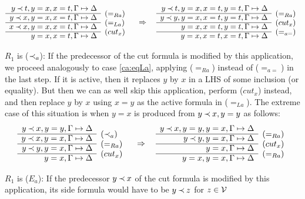\begin{PROOF}
\begin{LS}
\begin{LSA}
\[\begin{array}{rl}
y\Incl t, y=x, x=t,\GSD  \\ \cline{1-1}
y\Incl x, y=x, x=t, \GSD & \rabove{(=_{Ra})} \\ \cline{1-1}
x\Incl x, y=x, x=t, \GSD & \rabove{(=_{La})} \\ \cline{1-1}
          y=x, x=t, \GSD & \rabove{(cut_x)} 
\end{array} \conv
 \begin{array}{rl}
y\Incl t, y=x, x=t, y=t,\GSD  \\ \cline{1-1}
y\Incl y, y=x, x=t, y=t, \GSD & \rabove{(=_{Ra})} \\ \cline{1-1}
          y=x, x=t, y=t, \GSD & \rabove{(cut_x)} \\ \cline{1-1}
          y=x, x=t, x=t,\GSD & \rabove{(=_{a=})} \end{array} \]
\item $R_1$ is ($\mathbin{\prec}_a$):
If the predecessor of the cut formula is modified by this application, we
proceed analogously to case \ref{ca:eqLa}, applying ($=_{Ra}$) instead of
($=_{a=}$) in the last step. If it is active, then it replaces $y$ by $x$ in
a LHS of some inclusion (or equality). But then we can as well skip this application,
perform ($cut_x$) instead, and then replace $y$ by $x$ using $x=y$ as the
active formula in ($=_{La}$). The extreme case of this situation is when $y=x$
is produced from $y\mathbin{\prec} x, y=y$ as follows: 
\[ \begin{array}{rl}
y\Incl x, y=y,\GSD \\ \cline{1-1}
y\Incl x, y=x,\GSD & \rabove{(\Incl_a)} \\ \cline{1-1}
y\Incl y, y=x,\GSD & \rabove{(=_{Ra})} \\ \cline{1-1}
y=x, \GSD & \rabove{(cut_x)} \end{array}
\conv
 \begin{array}{rl}
y\Incl x, y=y,y=x, \GSD \\ \cline{1-1}
y\Incl y, y=x,\GSD & \rabove{(=_{Ra})} \\ \cline{1-1}
  y=x,\GSD & \rabove{(cut_x)} \\ \cline{1-1}
y=x, y=x, \GSD & \rabove{(=_{Ra})} \end{array}
 \]
%
\item\label{ca:imposEa} $R_1$ is ($E_a$):
If the predecessor $y\mathbin{\prec} x$ of the cut formula is modified by this
application, its side formula would have to be $y\mathbin{\prec} z$ for $z\in{\cal V}$

\end{LSA}
\end{LS}
\end{PROOF}
